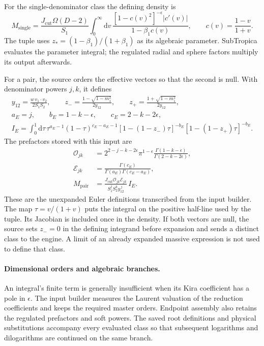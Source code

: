\documentclass[11pt,a4paper]{article}
\newcommand{\dd}{\mathrm{d}}
\newcommand{\eps}{\epsilon}
\newcommand{\cut}{\mathrm{cut}}
\begin{document}
For the single-denominator class the defining density is
\begin{equation}
 M_{\mathrm{single}}=
 \frac{J_{\cut}\Omega(D-2)}{S_1}
 \int_0^\infty\dd v\,
 \frac{[1-c(v)^2]^{-\eps}|c'(v)|}{1-\beta_1 c(v)},
 \qquad c(v)=\frac{1-v}{1+v}.
 \label{eq:singleinput}
\end{equation}
The tuple uses $z_*=(1-\beta_1)/(1+\beta_1)$ as its algebraic parameter.
SubTropica evaluates the parameter integral; the regulated radial and
sphere factors multiply its output afterwards.

For a pair, the source orders the effective vectors so that the second
is null. With denominator powers $j,k$, it defines
\begin{gather}
 y_{12}=\frac{w\,v_1\cdot v_2}{2S_1S_2},\qquad
 z_- =\frac{1-\sqrt{1-m_1^2}}{2y_{12}},\qquad
 z_+ =\frac{1+\sqrt{1-m_1^2}}{2y_{12}},\\
 a_E=j,\qquad b_E=1-k-\eps,\qquad c_E=2-k-2\eps,\\
 I_E=\int_0^1\dd\tau\,
 \tau^{a_E-1}(1-\tau)^{c_E-a_E-1}
 [1-(1-z_-)\tau]^{-b_E}
 [1-(1-z_+)\tau]^{-b_E}.
 \label{eq:paireuler}
\end{gather}
The prefactors stored with this input are
\begin{align}
 \mathcal O_{jk}&=
 2^{2-j-k-2\eps}\pi^{1-\eps}
 \frac{\Gamma(1-k-\eps)}{\Gamma(2-k-2\eps)},\\
 \mathcal E_{jk}&=
 \frac{\Gamma(c_E)}{\Gamma(a_E)\Gamma(c_E-a_E)},\\
 M_{\mathrm{pair}}&=
 \frac{J_{\cut}\mathcal O_{jk}\mathcal E_{jk}}
 {S_1^jS_2^k y_{12}^{\,j}}\,I_E.
 \label{eq:pairprefactor}
\end{align}
These are the unexpanded Euler definitions transcribed from the input
builder. The map $\tau=v/(1+v)$ puts the integral on the positive
half-line used by the tuple. Its Jacobian is included once in the
density. If both vectors are null, the source sets $z_-=0$ in the
defining integrand before expansion and sends a distinct class to the
engine. A limit of an already expanded massive expression is not used
to define that class.

\paragraph{Dimensional orders and algebraic branches.}
An integral's finite term is generally insufficient when its Kira
coefficient has a pole in $\eps$. The input builder measures the Laurent
valuation of the reduction coefficients and keeps the required master
orders. Endpoint assembly also retains the regulated prefactors and
soft powers. The saved root definitions and physical substitutions
accompany every evaluated class so that subsequent logarithms and
dilogarithms are continued on the same branch.
\end{document}
